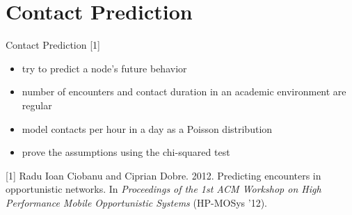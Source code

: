 \documentclass{beamer}
\begin{document}
\section{Contact Prediction}
\begin{frame}{Contact Prediction [1]}
	\begin{itemize}
		\item try to predict a node's future behavior
		\item number of encounters and contact duration in an academic environment are regular
		\item model contacts per hour in a day as a Poisson distribution
		\item prove the assumptions using the chi-squared test
	\end{itemize}
	
	\begin{figure}[!t]
		\centering
		\label{fig:predictability}
	\end{figure}
	
	\tiny{[1] Radu Ioan Ciobanu and Ciprian Dobre. 2012. Predicting encounters in opportunistic networks. In \emph{Proceedings of the 1st ACM Workshop on High Performance Mobile Opportunistic Systems} (HP-MOSys '12).}
\end{frame}
\end{document}
